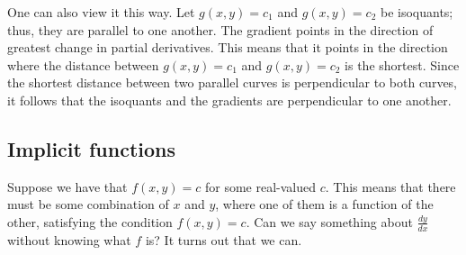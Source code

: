 \documentclass[a4paper, 12pt,oneside,openany]{book}
\begin{document}
One can also view it this way. Let $g(x, y) = c_1$ and $g(x, y) = c_2$ be isoquants; thus, they are parallel to one another. The gradient points in the direction of greatest change in partial derivatives. This means that it points in the direction where the distance between $g(x, y) = c_1$ and $g(x, y) = c_2$ is the shortest. Since the shortest distance between two parallel curves is perpendicular to both curves, it follows that the isoquants and the gradients are perpendicular to one another.



\subsection{Implicit functions}

Suppose we have that $f(x, y) = c$ for some real-valued $c$. This means that there must be some combination of $x$ and $y$, where one of them is a function of the other, satisfying the condition $f(x, y)=c$. Can we say something about $\frac{dy}{dx}$ without knowing what $f$ is? It turns out that we can.


\end{document}
